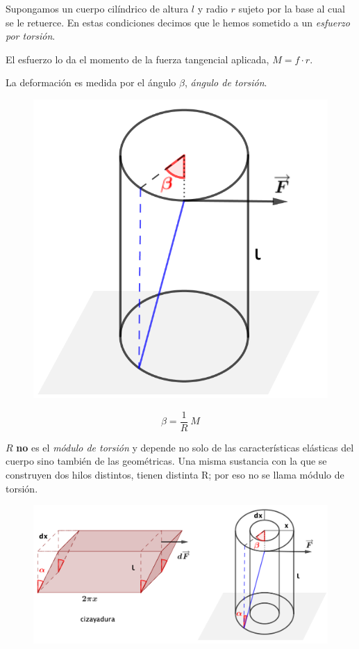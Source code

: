 \begin{multicols}{2}
Supongamos un cuerpo cilíndrico de altura $l$ y radio $r$ sujeto por la base al cual se le retuerce. En estas condiciones decimos que le hemos sometido a un \emph{esfuerzo por torsión}.

El esfuerzo lo da el momento de la fuerza tangencial aplicada, $M=f\cdot r$.

La deformación es medida por el ángulo $\beta$, \emph{ángulo de torsión}.



\begin{figure}[H]
	\centering
	\includegraphics[width=.5\textwidth]{imagenes/imagenes09/T09IM07.png}
\end{figure}		
\end{multicols}

$$ \beta = \dfrac 1 R \ M$$

$R$ \textbf{no} es el \emph{módulo de torsión} y depende no solo de las características elásticas del cuerpo sino también de las geométricas. Una misma sustancia con la que se construyen dos hilos distintos, tienen distinta R; por eso no se llama módulo de torsión.

\begin{figure}[H]
	\centering
	\includegraphics[width=1\textwidth]{imagenes/imagenes09/T09IM08.png}
\end{figure}	

